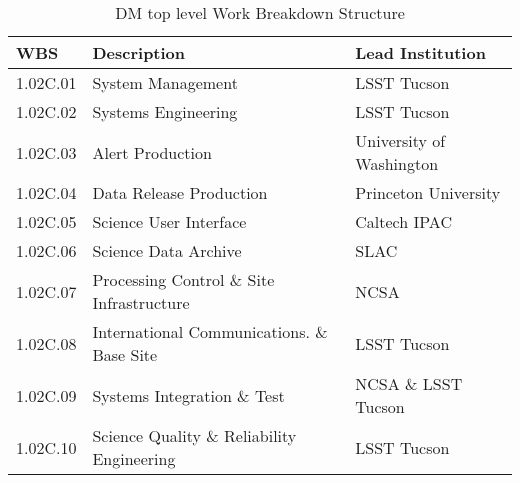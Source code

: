 \begin{table}
\caption{DM top level Work Breakdown Structure \label{tab:wbs}}
\begin{tabular}[htb]{|l|l|l|} \hline
{\bf WBS}  &  {\bf Description}   &  {\bf Lead Institution}\\ \hline
1.02C.01& System Management                       &  LSST Tucson \\ \hline
1.02C.02& Systems Engineering                     &  LSST Tucson \\ \hline
1.02C.03& Alert Production                        &  University of Washington\\ \hline
1.02C.04& Data Release Production                 &  Princeton University\\ \hline
1.02C.05& Science User Interface                  &  Caltech IPAC\\ \hline
1.02C.06& Science Data Archive                    &  SLAC\\ \hline
1.02C.07& Processing Control \& Site Infrastructure & NCSA\\ \hline
1.02C.08& International Communications. \& Base Site&  LSST Tucson \\ \hline
1.02C.09& Systems Integration \& Test               & NCSA \& LSST Tucson \\ \hline
1.02C.10& Science Quality \& Reliability Engineering& LSST Tucson \\ \hline
\end{tabular}
\end{table}
